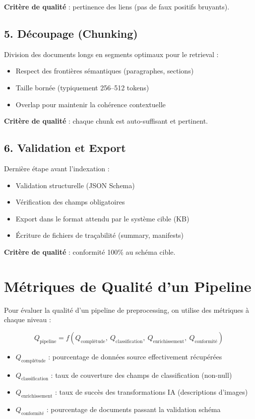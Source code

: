 \documentclass[12pt,a4paper]{report}
\begin{document}
\textbf{Critère de qualité} : pertinence des liens (pas de faux positifs bruyants).

\subsection{5. Découpage (Chunking)}

Division des documents longs en segments optimaux pour le retrieval :
\begin{itemize}
  \item Respect des frontières sémantiques (paragraphes, sections)
  \item Taille bornée (typiquement 256--512 tokens)
  \item Overlap pour maintenir la cohérence contextuelle
\end{itemize}

\textbf{Critère de qualité} : chaque chunk est auto-suffisant et pertinent.

\subsection{6. Validation et Export}

Dernière étape avant l'indexation :
\begin{itemize}
  \item Validation structurelle (JSON Schema)
  \item Vérification des champs obligatoires
  \item Export dans le format attendu par le système cible (KB)
  \item Écriture de fichiers de traçabilité (summary, manifests)
\end{itemize}

\textbf{Critère de qualité} : conformité 100\% au schéma cible.

\section{Métriques de Qualité d'un Pipeline}

Pour évaluer la qualité d'un pipeline de preprocessing, on utilise des métriques à chaque niveau :

\begin{equation}
Q_{\text{pipeline}} = f(Q_{\text{complétude}},\ Q_{\text{classification}},\ Q_{\text{enrichissement}},\ Q_{\text{conformité}})
\end{equation}

\begin{itemize}
  \item $Q_{\text{complétude}}$ : pourcentage de données source effectivement récupérées
  \item $Q_{\text{classification}}$ : taux de couverture des champs de classification (non-null)
  \item $Q_{\text{enrichissement}}$ : taux de succès des transformations IA (descriptions d'images)
  \item $Q_{\text{conformité}}$ : pourcentage de documents passant la validation schéma
\end{itemize}
\end{document}
